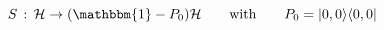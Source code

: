 \begin{equation}
 S\,:\,\mathcal{H}\rightarrow (\mathbbm{1}-P_0)\mathcal{H}
 \qquad\text{with}\qquad P_0=|0,0\rangle\langle 0,0|
\end{equation}

